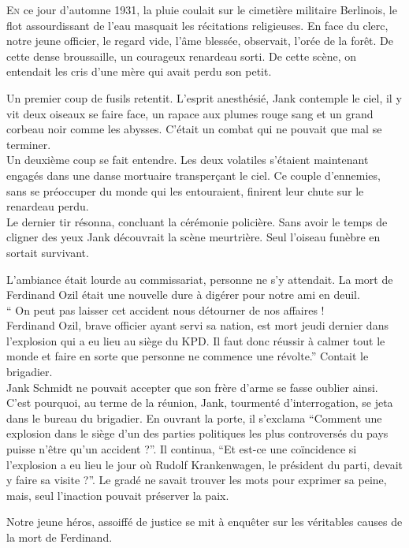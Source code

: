 \lettrine{E}{n} ce jour d'automne 1931, la pluie coulait sur le cimetière militaire Berlinois,
le flot assourdissant de l'eau masquait les récitations religieuses.
En face du clerc, notre jeune officier, le regard vide, l'âme blessée, observait, l'orée de la forêt. 
De cette dense broussaille, un courageux renardeau sorti.
De cette scène, on entendait les cris d'une mère qui avait perdu son petit.

Un premier coup de fusils retentit.
L'esprit anesthésié, Jank contemple le ciel, il y vit deux oiseaux se faire face, un rapace aux plumes rouge sang et un grand corbeau noir comme les abysses.
C'était un combat qui ne pouvait que mal se terminer.\\
Un deuxième coup se fait entendre.
Les deux volatiles s'étaient maintenant engagés dans une danse mortuaire transperçant le ciel.
Ce couple d'ennemies, sans se préoccuper du monde qui les entouraient, finirent leur chute sur le renardeau perdu.\\
Le dernier tir résonna, concluant la cérémonie policière.
Sans avoir le temps de cligner des yeux Jank découvrait la scène meurtrière.
Seul l'oiseau funèbre en sortait survivant.

L'ambiance était lourde au commissariat, personne ne s'y attendait.
La mort de Ferdinand Ozil était une nouvelle dure à digérer pour notre ami en deuil.\\
\enquote{%
    On peut pas laisser cet accident nous détourner de nos affaires !\\
    Ferdinand Ozil, brave officier ayant servi sa nation, est mort jeudi dernier dans l'explosion qui a eu lieu au siège du KPD.
    Il faut donc réussir à calmer tout le monde et faire en sorte que personne ne commence une révolte.}
Contait le brigadier.\\
Jank Schmidt ne pouvait accepter que son frère d'arme se fasse oublier ainsi.
C'est pourquoi, au terme de la réunion, Jank, tourmenté d'interrogation, se jeta dans le bureau du brigadier.
En ouvrant la porte, il s'exclama
\enquote{Comment une explosion dans le siège d'un des parties politiques les plus controversés du pays puisse n'être qu'un accident ?}.
Il continua,
\enquote{Et est-ce une coïncidence si l'explosion a eu lieu le jour où Rudolf Krankenwagen, le président du parti, devait y faire sa visite ?}.
Le gradé ne savait trouver les mots pour exprimer sa peine, mais, seul l'inaction pouvait préserver la paix.

Notre jeune héros, assoiffé de justice se mit à enquêter sur les véritables causes de la mort de Ferdinand.

